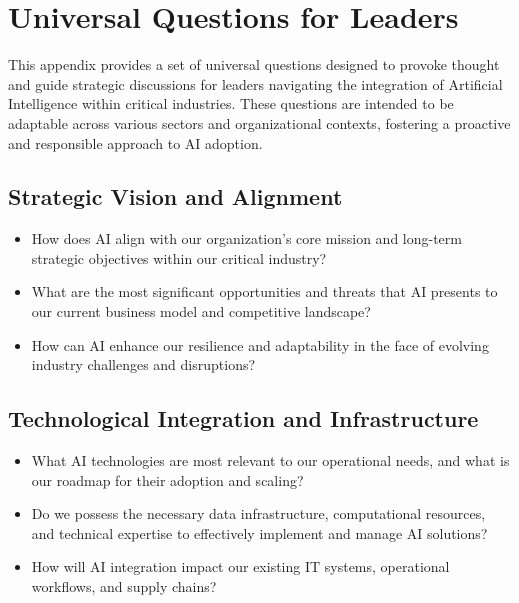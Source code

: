 \chapter{Universal Questions for Leaders}
\label{chap:universal_questions_for_leaders}

This appendix provides a set of universal questions designed to provoke thought and guide strategic discussions for leaders navigating the integration of Artificial Intelligence within critical industries. These questions are intended to be adaptable across various sectors and organizational contexts, fostering a proactive and responsible approach to AI adoption.

\section*{Strategic Vision and Alignment}
\begin{itemize}
    \item How does AI align with our organization's core mission and long-term strategic objectives within our critical industry?
    \item What are the most significant opportunities and threats that AI presents to our current business model and competitive landscape?
    \item How can AI enhance our resilience and adaptability in the face of evolving industry challenges and disruptions?
\end{itemize}

\section*{Technological Integration and Infrastructure}
\begin{itemize}
    \item What AI technologies are most relevant to our operational needs, and what is our roadmap for their adoption and scaling?
    \item Do we possess the necessary data infrastructure, computational resources, and technical expertise to effectively implement and manage AI solutions?
    \item How will AI integration impact our existing IT systems, operational workflows, and supply chains?
\end{itemize}

